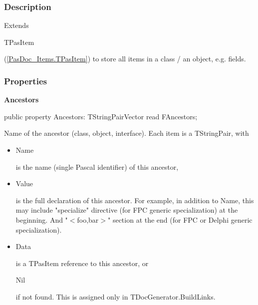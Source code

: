 \documentclass{report}
\newif\ifpdf
\begin{document}
\subsubsection*{\large{\textbf{Description}}\normalsize\hspace{1ex}\hfill}
Extends \begin{ttfamily}TPasItem\end{ttfamily}(\ref{PasDoc_Items.TPasItem}) to store all items in a class / an object, e.g. fields.\subsubsection*{\large{\textbf{Properties}}\normalsize\hspace{1ex}\hfill}
\begin{list}{}{
\setlength{\itemindent}{0cm}
\setlength{\listparindent}{0cm}
\setlength{\leftmargin}{\evensidemargin}
\addtolength{\leftmargin}{\tmplength}
\settowidth{\labelsep}{X}
\addtolength{\leftmargin}{\labelsep}
\setlength{\labelwidth}{\tmplength}
}
\label{PasDoc_Items.TPasCio-Ancestors}
\item[\textbf{Ancestors}\hfill]
\ifpdf
\begin{flushleft}
\fi
\begin{ttfamily}
public property Ancestors: TStringPairVector read FAncestors;\end{ttfamily}

\ifpdf
\end{flushleft}
\fi


\par Name of the ancestor (class, object, interface). Each item is a TStringPair, with \begin{itemize}
\item \begin{ttfamily}Name\end{ttfamily} is the name (single Pascal identifier) of this ancestor,
\item \begin{ttfamily}Value\end{ttfamily} is the full declaration of this ancestor. For example, in addition to Name, this may include "specialize" directive (for FPC generic specialization) at the beginning. And "{$<$}foo,bar{$>$}" section at the end (for FPC or Delphi generic specialization).
\item \begin{ttfamily}Data\end{ttfamily} is a TPasItem reference to this ancestor, or \begin{ttfamily}Nil\end{ttfamily} if not found. This is assigned only in TDocGenerator.BuildLinks.
\end{itemize}


\end{list}
\end{document}
